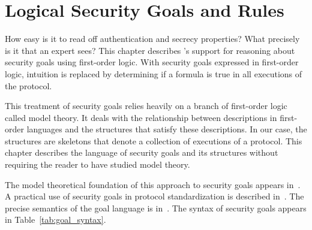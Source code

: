 \chapter{Logical Security Goals and Rules}
\label{ch:goals}

\newtheorem{axiom}{Trust Assumption}

How easy is it to read off authentication and secrecy properties?
What precisely is it that an expert sees?  This chapter describes
{\cpsa}'s support for reasoning about security goals using first-order
logic.  With security goals expressed in first-order logic, intuition
is replaced by determining if a formula is true in all executions of
the protocol.


This treatment of security goals relies heavily on a branch of
first-order logic called model theory.  It deals with the relationship
between descriptions in first-order languages and the structures that
satisfy these descriptions.  In our case, the structures are skeletons
that denote a collection of executions of a protocol.  This chapter
describes the language of security goals and its structures without
requiring the reader to have studied model theory.

The model theoretical foundation of this approach to security goals
appears in~\cite{Guttman14}.  A practical use of security goals in
protocol standardization is described
in~\cite{guttman2014security,RoweEtAl2016}.  The precise semantics of
the goal language is in~\cite{Ramsdell12}.  The syntax of
security goals appears in Table~\ref{tab:goal_syntax}.

